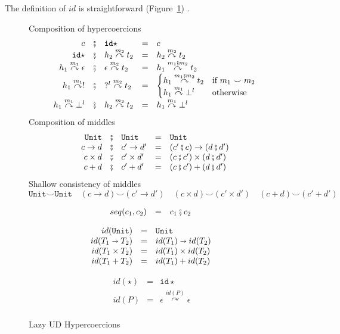 \documentclass[acmsmall,review]{acmart}\settopmatter{printfolios=true,printccs=false,printacmref=false}
\newcommand{\funrule}[3]{#1 &=& #2 & #3\\}
\newcommand{\plus}[0]{+}
\newcommand{\POOunit}[0]{\mathtt{Unit}}
\newcommand{\POOfun}[2]{#1 \shortrightarrow #2}
\newcommand{\POOprod}[2]{#1 \times #2}
\newcommand{\POOsum}[2]{#1 \plus #2}
\newcommand{\hyperCoercionI}[0]{\mathtt{id\star}}
\newcommand{\hyperCoercionC}[3]{#1 \overset{#2}{\curvearrowright} #3}
\begin{document}
The definition of $id$ is straightforward (Figure~\ref{fig:HC-UD}) .

\begin{figure}
  Composition of hypercoercions 
  \[
  \begin{array}{rclclr}
  c &\fatsemi& \hyperCoercionI{} &=& c\\
  \hyperCoercionI{} &\fatsemi& \hyperCoercionC{h_2}{m_2}{t_2} &=&
       \hyperCoercionC{h_2}{m_2}{t_2} \\
  \hyperCoercionC{h_1}{m_1}{\epsilon} &\fatsemi& 
  \hyperCoercionC{\epsilon}{m_2}{t_2} &=&
       \hyperCoercionC{h_1}{m_1 \fatsemi m_2}{t_2} \\
  \hyperCoercionC{h_1}{m_1}{!} &\fatsemi& \hyperCoercionC{?^l}{m_2}{t_2} &=&
  \begin{cases}
    \hyperCoercionC{h_1}{m_1 \fatsemi m_2}{t_2} & \text{if } m_1 \smile m_2 \\
    \hyperCoercionC{h_1}{m_1}{\bot^l} & \text{otherwise}
  \end{cases} \\
  \hyperCoercionC{h_1}{m_1}{\bot^l} &\fatsemi& \hyperCoercionC{h_2}{m_2}{t_2} 
  &=&
     \hyperCoercionC{h_1}{m_1}{\bot^l}
  \end{array}
  \]
  Composition of middles 
  \[
  \begin{array}{rclclr}  
  \POOunit &\fatsemi& \POOunit &=& \POOunit \\
  c \to d &\fatsemi& c' \to d' &=& (c' \fatsemi c) \to (d \fatsemi d') \\
  c \times d &\fatsemi& c' \times d' &=& (c \fatsemi c') \times (d \fatsemi d') \\
  c + d &\fatsemi& c' + d' &=& (c \fatsemi c') + (d \fatsemi d')
  \end{array}
  \]
  Shallow consistency of middles 
  \[
  \POOunit \smile \POOunit \quad
  (c \to d) \smile (c' \to d') \quad
  (c \times d) \smile (c' \times d') \quad
  (c + d) \smile (c' + d')
  \]

  \[
  \begin{array}{rclr}
    \funrule{seq(c_1,c_2)}{
      c_1 \fatsemi c_2
    }{}
  \end{array}
  \]
  
  \[
  \begin{array}{rclr}
    \funrule{id(\POOunit)}{\POOunit}{}
    \funrule{id(\POOfun{T_1}{T_2})}{
    \POOfun{id(T_1)}{id(T_2)}
    }{}
    \funrule{id(\POOprod{T_1}{T_2})}{
    \POOprod{id(T_1)}{id(T_2)}
    }{}
    \funrule{id(\POOsum{T_1}{T_2})}{
    \POOsum{id(T_1)}{id(T_2)}
    }{}
  \end{array}
  \]
  
  \[
  \begin{array}{rclr}
    \funrule{id(\star)}{
    \hyperCoercionI
    }{}
    \funrule{id(P)}{
    \hyperCoercionC{\epsilon}{id(P)}{\epsilon}
    }{}
  \end{array}
  \]
  \caption{Lazy UD Hypercoercions}
  \label{fig:HC-UD}
\end{figure}
\end{document}
